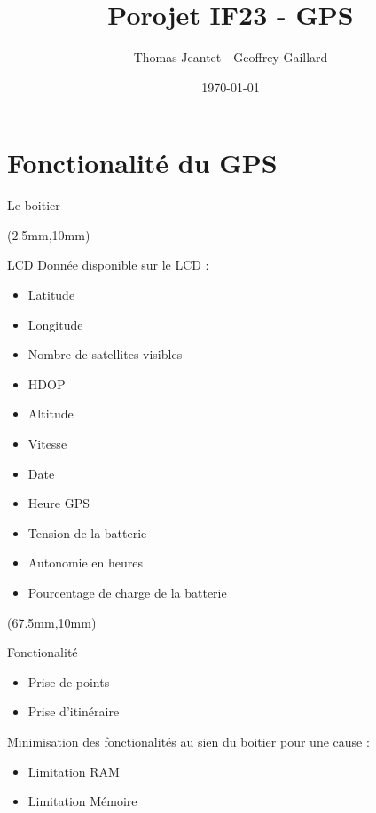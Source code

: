 \documentclass[10pt]{beamer}
\title{Porojet IF23 - GPS}
\date{\today}
\author{Thomas Jeantet - Geoffrey Gaillard}
\institute{Université Technologique de Troyes}
\begin{document}
	\maketitle
	\section{Fonctionalité du GPS}
	\begin{frame}{Le boitier}

		\begin{textblock*}{80mm}(2.5mm,10mm)
			\begin{block}{LCD}
			Donnée disponible sur le LCD :
			\begin{itemize}
				\item Latitude
				\item Longitude
				\item Nombre de satellites visibles
				\item HDOP
				\item Altitude
				\item Vitesse
				\item Date
				\item Heure GPS
				\item Tension de la batterie
				\item Autonomie en heures
				\item Pourcentage de charge de la batterie
			\end{itemize}
			\end{block}
		\end{textblock*}
		
		\begin{textblock*}{60mm}(67.5mm,10mm)
			\begin{block}{Fonctionalité}
			\begin{itemize}
				\item Prise de points
				\item Prise d'itinéraire
			\end{itemize}
			Minimisation des fonctionalités au sien du boitier pour une cause :
			\begin{itemize}
				\item Limitation RAM
				\item Limitation Mémoire
			\end{itemize}
			\end{block}
		\end{textblock*}
	\end{frame}
\end{document}
